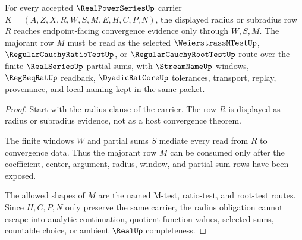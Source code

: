 \begin{theorem}
\label{thm:realpowerseries-majorant-radius-obligation}
For every accepted $\RealPowerSeriesUp$ carrier $K=(A,Z,X,R,W,S,M,E,H,C,P,N)$, the displayed radius or subradius row $R$ reaches endpoint-facing convergence evidence only through $W,S,M$. The majorant row $M$ must be read as the selected $\WeierstrassMTestUp$, $\RegularCauchyRatioTestUp$, or $\RegularCauchyRootTestUp$ route over the finite $\RealSeriesUp$ partial sums, with $\StreamNameUp$ windows, $\RegSeqRatUp$ readback, $\DyadicRatCoreUp$ tolerances, transport, replay, provenance, and local naming kept in the same packet.
\end{theorem}
\begin{proof}
Start with the radius clause of the carrier. The row $R$ is displayed as radius or subradius evidence, not as a host convergence theorem.

The finite windows $W$ and partial sums $S$ mediate every read from $R$ to convergence data. Thus the majorant row $M$ can be consumed only after the coefficient, center, argument, radius, window, and partial-sum rows have been exposed.

The allowed shapes of $M$ are the named M-test, ratio-test, and root-test routes. Since $H,C,P,N$ only preserve the same carrier, the radius obligation cannot escape into analytic continuation, quotient function values, selected sums, countable choice, or ambient $\RealUp$ completeness.
\end{proof}

